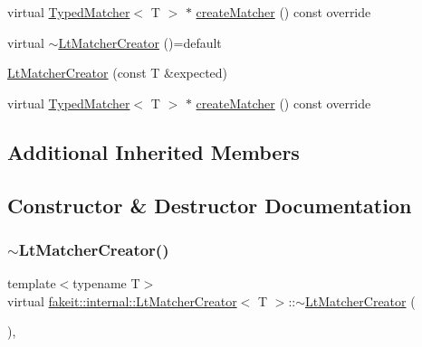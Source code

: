 \begin{DoxyCompactItemize}
virtual \mbox{\hyperlink{structfakeit_1_1TypedMatcher}{Typed\+Matcher}}$<$ T $>$ $\ast$ \mbox{\hyperlink{structfakeit_1_1internal_1_1LtMatcherCreator_a3eb22e77b3c4622fa47160d9bc689c8e}{create\+Matcher}} () const override
\item 
virtual \mbox{\hyperlink{structfakeit_1_1internal_1_1LtMatcherCreator_a6a496de15c15d4a1345baf1d14e17a8f}{$\sim$\+Lt\+Matcher\+Creator}} ()=default
\item 
\mbox{\hyperlink{structfakeit_1_1internal_1_1LtMatcherCreator_ab8164ead0551b2b74d936d590b970392}{Lt\+Matcher\+Creator}} (const T \&expected)
\item 
virtual \mbox{\hyperlink{structfakeit_1_1TypedMatcher}{Typed\+Matcher}}$<$ T $>$ $\ast$ \mbox{\hyperlink{structfakeit_1_1internal_1_1LtMatcherCreator_a3eb22e77b3c4622fa47160d9bc689c8e}{create\+Matcher}} () const override
\end{DoxyCompactItemize}
\subsection*{Additional Inherited Members}


\subsection{Constructor \& Destructor Documentation}
\mbox{\label{structfakeit_1_1internal_1_1LtMatcherCreator_a6a496de15c15d4a1345baf1d14e17a8f}} 
\subsubsection{\texorpdfstring{$\sim$LtMatcherCreator()}{~LtMatcherCreator()}\hspace{0.1cm}{\footnotesize\ttfamily [1/9]}}
{\footnotesize\ttfamily template$<$typename T$>$ \\
virtual \mbox{\hyperlink{structfakeit_1_1internal_1_1LtMatcherCreator}{fakeit\+::internal\+::\+Lt\+Matcher\+Creator}}$<$ T $>$\+::$\sim$\mbox{\hyperlink{structfakeit_1_1internal_1_1LtMatcherCreator}{Lt\+Matcher\+Creator}} (\begin{DoxyParamCaption}{ }\end{DoxyParamCaption})\hspace{0.3cm}{\ttfamily [virtual]}, {\ttfamily [default]}}

